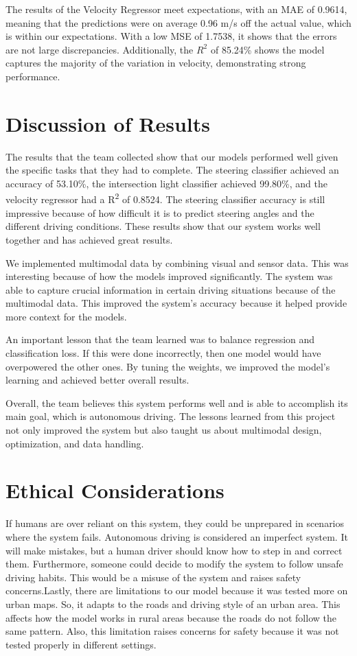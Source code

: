 \documentclass{article} %
\begin{document}
The results of the Velocity Regressor meet expectations, with an MAE of 0.9614, meaning that the predictions were on average 0.96 m/s 
off the actual value, which is within our expectations. With a low MSE of 1.7538, it shows that the errors are not large discrepancies. 
Additionally, the $R^2$ of 85.24\% shows the model captures the majority of the variation in velocity, demonstrating strong performance. 


\section{Discussion of Results}

The results that the team collected show that our models performed well given the specific tasks that
they had to complete. The steering classifier achieved an accuracy of 53.10\%, the intersection light
classifier achieved 99.80\%, and the velocity regressor had a R\textsuperscript{2} of 0.8524. The steering
classifier accuracy is still impressive because of how difficult it is to predict steering angles and
the different driving conditions. These results show that our system works well together and has
achieved great results.

We implemented multimodal data by combining visual and sensor data. This was interesting because of how
the models improved significantly. The system was able to capture crucial information in certain driving
situations because of the multimodal data. This improved the system’s accuracy because it helped provide
more context for the models.

An important lesson that the team learned was to balance regression and classification loss. If this
were done incorrectly, then one model would have overpowered the other ones. By tuning the weights,
we improved the model's learning and achieved better overall results.

Overall, the team believes this system performs well and is able to accomplish its main goal, which is
autonomous driving. The lessons learned from this project not only improved the system but also taught
us about multimodal design, optimization, and data handling.


\section{Ethical Considerations}

If humans are over reliant on this system, they could be unprepared in scenarios where the system fails.
Autonomous driving is considered an imperfect system. It will make mistakes, but a human driver should
know how to step in and correct them. Furthermore, someone could decide to modify the system to follow
unsafe driving habits. This would be a misuse of the system and raises safety concerns.Lastly, there are limitations to our model because it was tested more on urban maps. So, it adapts to the
roads and driving style of an urban area. This affects how the model works in rural areas because the roads
do not follow the same pattern. Also, this limitation raises concerns for safety because it was not tested
properly in different settings.
\end{document}
